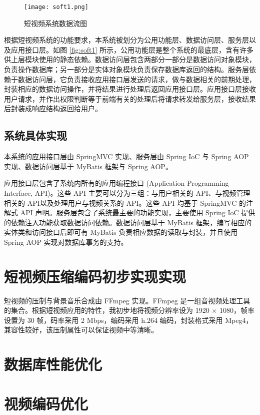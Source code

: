 \begin{figure}[!ht]
    \centering
    \texttt{[image: soft1.png]}
    \caption{短视频系统数据流图}
    \label{figs:soft1}
\end{figure}

根据短视频系统的功能要求，本系统被划分为公用功能层、数据访问层、服务层以及应用接口层。如图 \ref{fig:soft1} 所示，公用功能层是整个系统的最底层，含有许多供上层模块使用的静态依赖。数据访问层包含两部分一部分是数据访问对象模块，负责操作数据库；另一部分是实体对象模块负责保存数据库返回的结构。服务层依赖于数据访问层，它负责接收应用接口层发送的请求，做与数据相关的前期处理，封装相应的数据访问操作，并将结果进行处理后返回应用接口层。应用接口层接收用户请求，并作出权限判断等于前端有关的处理后将请求转发给服务层，接收结果后封装成响应结构返回给用户。

\subsection{系统具体实现}
本系统的应用接口层由 SpringMVC 实现、服务层由 Spring IoC 与 Spring AOP 实现、数据访问层基于 MyBatis 框架与 Spring AOP。

应用接口层包含了系统内所有的应用编程接口 (Application Programming Interface, API)。这些 API 主要可以分为三组：与用户相关的 API、与视频管理相关的 API以及处理用户与视频关系的 API。这些 API 均基于 SpringMVC 的注解式 API 声明。服务层包含了系统最主要的功能实现，主要使用 Spring IoC 提供的依赖注入功能获取数据访问依赖。数据访问层基于 MyBatis 框架，编写相应的实体类和访问接口后即可有 MyBatis 负责相应数据的读取与封装，并且使用 Spring AOP 实现对数据库事务的支持。



\section{短视频压缩编码初步实现实现}

短视频的压制与背景音乐合成由 FFmpeg 实现。FFmpeg 是一组音视频处理工具的集合。根据短视频应用的特性，我初步地将视频分辨率设为 1920 $\times$ 1080，帧率设置为 30 帧，码率采用 2 Mbps，编码采用 h.264 编码，封装格式采用 Mpeg4，兼容性较好，该压制属性可以保证视频中等清晰。




\section{数据库性能优化}



\section{视频编码优化}

